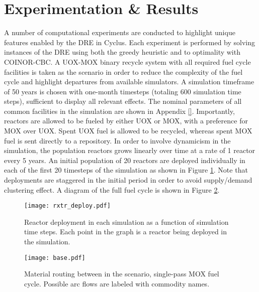 \section{Experimentation \& Results}\label{results}

A number of computational experiments are conducted to highlight unique features
enabled by the DRE in Cyclus. Each experiment is performed by solving instances
of the DRE using both the greedy heuristic and to optimality with COINOR-CBC. A
UOX-MOX binary recycle system with all required fuel cycle facilities is taken
as the \basecase scenario in order to reduce the complexity of the fuel cycle and
highlight departures from available simulators. A simulation timeframe of 50
years is chosen with one-month timesteps (totaling 600 simulation time steps),
sufficient to display all relevant effects. The nominal parameters of all common
facilities in the simulation are shown in Appendix \ref{}. Importantly, reactors
are allowed to be fueled by either UOX or MOX, with a preference for MOX over
UOX. Spent UOX fuel is allowed to be recycled, whereas spent MOX fuel is sent
directly to a repository. In order to involve dynamicism in the simulation, the
population reactors grows linearly over time at a rate of 1 reactor every 5
years. An initial population of 20 reactors are deployed individually in each of
the first 20 timesteps of the simulation as shown in Figure
\ref{fig:deploy}. Note that deployments are staggered in the initial period in
order to avoid supply/demand clustering effect. A diagram of the full
\basecase fuel cycle is shown in Figure \ref{fig:base}.

\begin{figure}
  \begin{center}
    \texttt{[image: rxtr\_deploy.pdf]}
    \caption[]{
      \label{fig:deploy}
      Reactor deployment in each simulation as a function of simulation time
      steps. Each point in the graph is a reactor being deployed in the
      simulation.}
  \end{center}
\end{figure}

\begin{figure}
  \begin{center}
    \texttt{[image: base.pdf]}
    \caption[]{
      \label{fig:base}
      Material routing between in the \basecase scenario, single-pass MOX fuel
      cycle. Possible arc flows are labeled with commodity names.}
  \end{center}
\end{figure}

